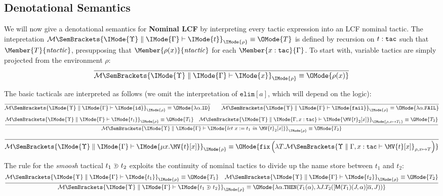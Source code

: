 \subsection{Denotational Semantics}

\newcommand\LCFElaboration[5]{%
  \mathcal{M}%
  \SemBrackets{
    #1\parallel #2\vdash%
    #3%
  }_{#5}%
}

\newcommand\LCFElab[6]{%
  \LCFElaboration{\IMode{#1}}{\IMode{#2}}{\IMode{#3}}{\IMode{#4}}{\IMode{#5}}%
  \equiv\OMode{#6}%
}

We will now give a denotational semantics for \textbf{Nominal LCF} by
interpreting every tactic expression into an LCF nominal tactic. The
intepretation $\LCFElab{\Upsilon}{\Gamma}{t}{\tau}{\rho}{T}$ is defined by
recursion on $t:\mathtt{tac}$ such that $\Member{T}{\LCFNominalTactic}$,
presupposing that $\Member{\rho(x)}{\LCFNominalTactic}$ for each
$\Member{x:\SortTac}{\Gamma}$.  To start with, variable tactics are simply
projected from the environment $\rho$:
\[
  \infer{
    \LCFElab{\Upsilon}{\Gamma}{x}{\SortTac}{\rho}{\rho(x)}
  }{
  }
\]

The basic tacticals are interpreted as follows (we omit the interpretation of
$\mathtt{elim}[a]$, which will depend on the logic):
\[
  \infer{
    \LCFElab{\Upsilon}{\Gamma}{\mathtt{id}}{\SortTac}{\rho}{
      \lambda\alpha.\mathtt{ID}
    }
  }{
  }
  \qquad
  \infer{
    \LCFElab{\Upsilon}{\Gamma}{\mathtt{fail}}{\SortTac}{\rho}{
      \lambda\alpha.\mathtt{FAIL}
    }
  }{
  }
\]
\[
  \infer{
    \LCFElab{\Upsilon}{\Gamma}{\TacLet{t_1}{x}{\MV{t}_2[x]}}{\SortTac}{\rho}{
      T_2
    }
  }{
    \LCFElab{\Upsilon}{\Gamma}{t_1}{\SortTac}{\rho}{T_1} &
    \LCFElab{\Upsilon}{\Gamma,x:\SortTac}{\MV{t}_2[x]}{\SortTac}{
      \rho,x\mapsto T_1
    }{
      T_2
    }
  }
\]
\[
  \infer{
    \LCFElab{\Upsilon}{\Gamma}{\TacFix{x}{\MV{t}[x]}}{\SortTac}{\rho}{
      \mathtt{fix}%
      \left(\lambda T.
        \LCFElaboration{\Upsilon}{\Gamma,x:\SortTac}{\MV{t}[x]}{\SortTac}{\rho,x\mapsto T}
      \right)
    }
  }{
  }
\]

The rule for the \emph{smoosh} tactical $t_1\supsetplus t_2$ exploits the
continuity of nominal tactics to divide up the name store between $t_1$ and $t_2$:
\[
  \infer{
    \LCFElab{\Upsilon}{\Gamma}{\TacSmoosh{t_1}{t_2}}{\SortTac}{\rho}{
      \lambda\alpha.\mathtt{THEN}(T_1(\alpha),\lambda J. T_2(\StreamChop{\alpha}{\ModC{T_1}(J,\alpha)}, J))
    }
  }{
    \LCFElab{\Upsilon}{\Gamma}{t_1}{\SortTac}{\rho}{T_1} &
    \LCFElab{\Upsilon}{\Gamma}{t_2}{\SortTac}{\rho}{T_2}
  }
\]

